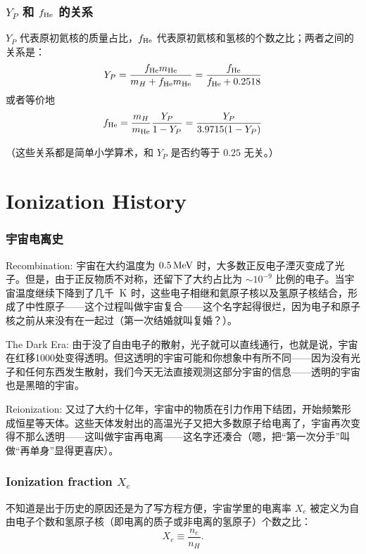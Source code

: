 \documentclass[CJK,13pt]{beamer}
\begin{document}
  \begin{frame}
    \frametitle{$Y_P$ 和 $f_{\rm He}$ 的关系}
    $Y_P$ 代表原初氦核的质量占比，$f_{\rm He}$ 代表原初氦核和氢核的个数之比；两者之间的关系是：
    $$Y_P = \frac{f_{\rm He} m_{\rm He}}{m_H + f_{\rm He} m_{\rm He}}=\frac{f_{\rm He}}{f_{\rm He}+0.2518}$$
    或者等价地
    $$f_{\rm He} = \frac{m_H}{m_{\rm He}}\frac{Y_P}{1-  Y_P}=\frac{Y_P}{3.9715(1-  Y_P)}$$

    （这些关系都是简单小学算术，和 $Y_P$ 是否约等于 $0.25$ 无关。）
    
  \end{frame}
  
  \section{Ionization History}

  
  \begin{frame}
    \frametitle{宇宙电离史}
    \bitem
    \item{{\blue Recombination}: {\scriptsize 宇宙在大约温度为 $0.5\,\mathrm{MeV}$ 时，大多数正反电子湮灭变成了光子。但是，由于正反物质不对称，还留下了大约占比为 $\sim 10^{-9}$ 比例的电子。当宇宙温度继续下降到了几千 $\,\mathrm{K}$ 时，这些电子相继和氦原子核以及氢原子核结合，形成了中性原子——这个过程叫做宇宙复合——这个名字起得很烂，因为电子和原子核之前从来没有在一起过（第一次结婚就叫复婚？）。}}
    \item{{\blue The Dark Era}: {\scriptsize 由于没了自由电子的散射，光子就可以直线通行，也就是说，宇宙在红移1000处变得透明。但这透明的宇宙可能和你想象中有所不同——因为没有光子和任何东西发生散射，我们今天无法直接观测这部分宇宙的信息——透明的宇宙也是黑暗的宇宙。}}
    \item{{\blue Reionization}: {\scriptsize 又过了大约十亿年，宇宙中的物质在引力作用下结团，开始频繁形成恒星等天体。这些天体发射出的高温光子又把大多数原子给电离了，宇宙再次变得不那么透明——这叫做宇宙再电离——这名字还凑合（嗯，把“第一次分手”叫做“再单身”显得更喜庆）。}}
      \eitem
  \end{frame}

  \begin{frame}
    \frametitle{Ionization fraction $X_e$}
    不知道是出于历史的原因还是为了写方程方便，宇宙学里的电离率 $X_e$ 被定义为自由电子个数和氢原子核（即电离的质子或非电离的氢原子）个数之比：
    $$X_e\equiv \frac{n_e}{n_H}.$$
  \end{frame}
\end{document}
